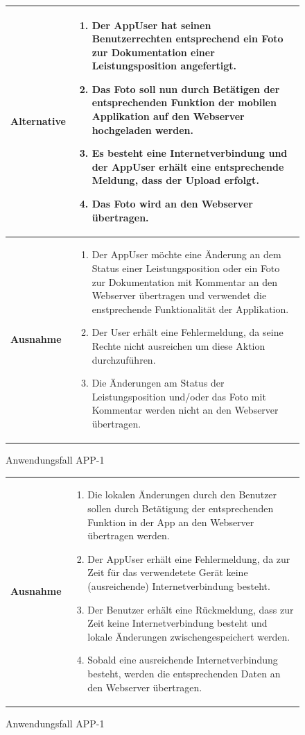			\begin{figure}[h]
	\centering
	\begin{tabularx}{\textwidth}{ X | X }
		\textbf{Alternative} & 
				\begin{enumerate}
					 \item Der AppUser hat seinen Benutzerrechten entsprechend ein Foto zur Dokumentation einer Leistungsposition angefertigt.
					 \item Das Foto soll nun durch Bet\"atigen der entsprechenden Funktion der mobilen Applikation auf den Webserver hochgeladen werden.
					 \item Es besteht eine Internetverbindung und der AppUser erh\"alt eine entsprechende Meldung,  dass der Upload erfolgt.
					 \item Das Foto wird an den Webserver \"ubertragen.
				\end{enumerate}  \\ \hline
						\textbf{Ausnahme} &
				\begin{enumerate}
					 \item Der AppUser m\"ochte eine \"Anderung an dem Status einer Leistungsposition oder ein Foto zur Dokumentation mit Kommentar an den Webserver \"ubertragen und verwendet die enstprechende Funktionalit\"at der Applikation.
					 \item Der User erh\"alt eine Fehlermeldung, da seine Rechte nicht ausreichen um diese Aktion durchzuf\"uhren.
					 \item Die \"Anderungen am Status der Leistungsposition und/oder das Foto mit Kommentar werden nicht an den Webserver \"ubertragen.
					 \end{enumerate} \\ \hline
	\end{tabularx}
	\caption{Anwendungsfall APP-1}
	\label{fig:anwendungsfall-app-tabelle-APP-1-2}
\end{figure}
			\begin{figure}[h]
	\centering
	\begin{tabularx}{\textwidth}{ X | X }
					 	\textbf{Ausnahme} &
				\begin{enumerate}
					\item Die lokalen \"Anderungen durch den Benutzer sollen durch Bet\"atigung der entsprechenden Funktion in der App an den Webserver \"ubertragen werden.
					\item Der AppUser erh\"alt eine Fehlermeldung,  da zur Zeit f\"ur das verwendetete Ger\"at keine (ausreichende) Internetverbindung besteht. 
					\item Der Benutzer erh\"alt eine R\"uckmeldung,  dass zur Zeit keine Internetverbindung besteht und lokale \"Anderungen zwischengespeichert werden.
					\item Sobald eine ausreichende Internetverbindung besteht,  werden die entsprechenden Daten an den Webserver \"ubertragen.
				\end{enumerate} 
				 	\end{tabularx}
	\caption{Anwendungsfall APP-1}
	\label{fig:anwendungsfall-app-tabelle-APP-1-3}
\end{figure}
